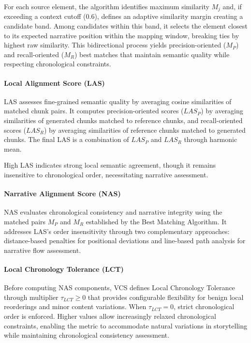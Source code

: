 \documentclass[letterpaper]{article} %
\begin{document}
For each source element, the algorithm identifies maximum similarity $M_j$ and, if exceeding a context cutoff (0.6), defines an adaptive similarity margin creating a candidate band. Among candidates within this band, it selects the element closest to its expected narrative position within the mapping window, breaking ties by highest raw similarity. This bidirectional process yields precision-oriented ($M_P$) and recall-oriented ($M_R$) best matches that maintain semantic quality while respecting chronological constraints.

\paragraph{Local Alignment Score (LAS)}
LAS assesses fine-grained semantic quality by averaging cosine similarities of matched chunk pairs. It computes precision-oriented scores ($LAS_P$) by averaging similarities of generated chunks matched to reference chunks, and recall-oriented scores ($LAS_R$) by averaging similarities of reference chunks matched to generated chunks. The final LAS is a combination of $LAS_P$ and $LAS_R$ through harmonic mean.

High LAS indicates strong local semantic agreement, though it remains insensitive to chronological order, necessitating narrative assessment.

\paragraph{Narrative Alignment Score (NAS)}
NAS evaluates chronological consistency and narrative integrity using the matched pairs $M_P$ and $M_R$ established by the Best Matching Algorithm. It addresses LAS's order insensitivity through two complementary approaches: distance-based penalties for positional deviations and line-based path analysis for narrative flow assessment.

\paragraph{Local Chronology Tolerance (LCT)}
Before computing NAS components, VCS defines Local Chronology Tolerance through multiplier $\tau_{LCT} \geq 0$ that provides configurable flexibility for benign local reorderings and minor content variations. When $\tau_{LCT}=0$, strict chronological order is enforced. Higher values allow increasingly relaxed chronological constraints, enabling the metric to accommodate natural variations in storytelling while maintaining chronological consistency assessment.
\end{document}

